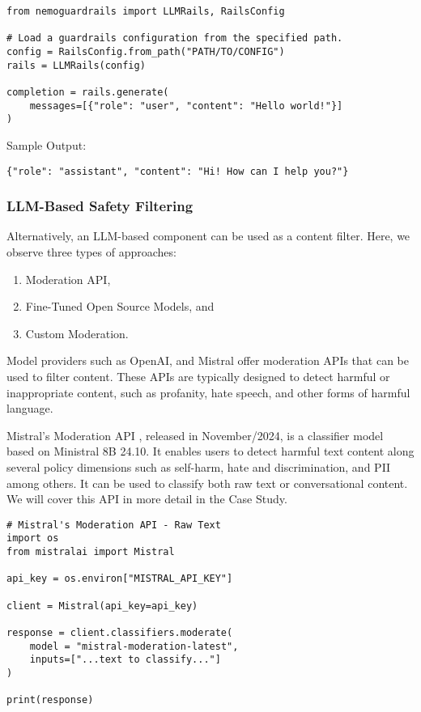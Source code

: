 \begin{verbatim}
from nemoguardrails import LLMRails, RailsConfig

# Load a guardrails configuration from the specified path.
config = RailsConfig.from_path("PATH/TO/CONFIG")
rails = LLMRails(config)

completion = rails.generate(
    messages=[{"role": "user", "content": "Hello world!"}]
)
\end{verbatim}

Sample Output:
\begin{verbatim}
{"role": "assistant", "content": "Hi! How can I help you?"}
\end{verbatim}


\subsubsection{LLM-Based Safety Filtering}

Alternatively, an LLM-based component can be used as a content filter. Here, we observe three types of approaches: 
\begin{enumerate}
    \item Moderation API,
    \item Fine-Tuned Open Source Models, and
    \item Custom Moderation.
\end{enumerate}

Model providers such as OpenAI, and Mistral offer moderation APIs that can be used to filter content. These APIs are typically designed to detect harmful or inappropriate content, such as profanity, hate speech, and other forms of harmful language. 

Mistral's Moderation API , released in November/2024, is a classifier model based on Ministral 8B 24.10. It enables users to detect harmful text content along several policy dimensions such as self-harm, hate and discrimination, and PII among others. It can be used to classify both raw text or conversational content. We will cover this API in more detail in the Case Study.

\begin{verbatim}
# Mistral's Moderation API - Raw Text
import os
from mistralai import Mistral

api_key = os.environ["MISTRAL_API_KEY"]

client = Mistral(api_key=api_key)

response = client.classifiers.moderate(
    model = "mistral-moderation-latest",  
    inputs=["...text to classify..."]
)

print(response)
\end{verbatim}

